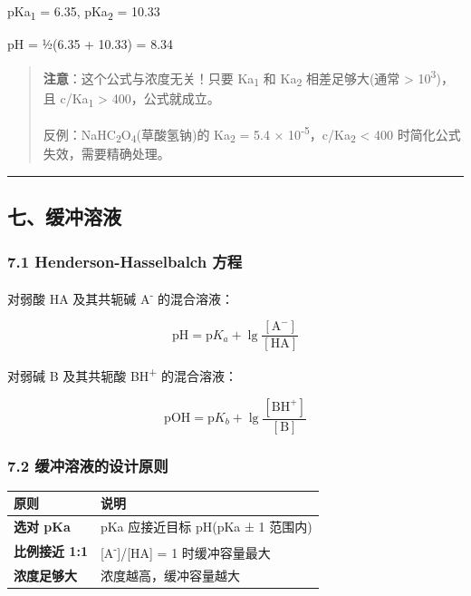 \documentclass[a4paper,11pt]{ctexart}
\newcounter{none}
\newcommand{\箭}{\ensuremath{\rightarrow}}
\newcommand{\左箭}{\ensuremath{\leftarrow}}
\newcommand{\上箭}{\ensuremath{\uparrow}}
\newcommand{\下箭}{\ensuremath{\downarrow}}
\newcommand{\衡}{\ensuremath{\rightleftharpoons}}
\newcommand{\双箭}{\ensuremath{\leftrightarrow}}
\newcommand{\约等于}{\ensuremath{\approx}}
\newcommand{\小于等于}{\ensuremath{\leq}}
\newcommand{\大于等于}{\ensuremath{\geq}}
\newcommand{\不等于}{\ensuremath{\neq}}
\newcommand{\西格马}{\ensuremath{\sigma}}
\newcommand{\派}{\ensuremath{\pi}}
\begin{document}
pKa\textsubscript{1} = 6.35, pKa\textsubscript{2} = 10.33

pH = ½(6.35 + 10.33) = 8.34

\begin{quote}
\textbf{注意}：这个公式与浓度无关！只要 Ka\textsubscript{1} 和 Ka\textsubscript{2} 相差足够大(通常 \textgreater{} 10\textsuperscript{3})，且 c/Ka\textsubscript{1} \textgreater{} 400，公式就成立。

反例：NaHC\textsubscript{2}O\textsubscript{4}(草酸氢钠)的 Ka\textsubscript{2} = 5.4 × 10\textsuperscript{-5}，c/Ka\textsubscript{2} \textless{} 400 时简化公式失效，需要精确处理。
\end{quote}

\begin{center}\rule{0.5\linewidth}{0.5pt}\end{center}

\subsection{七、缓冲溶液}\label{ux4e03ux7f13ux51b2ux6eb6ux6db2}

\subsubsection{7.1 Henderson-Hasselbalch 方程}\label{henderson-hasselbalch-ux65b9ux7a0b}

对弱酸 HA 及其共轭碱 A\textsuperscript{-} 的混合溶液：

\[
\boxed{\mathrm{pH} = \mathrm{p}K_a + \lg\frac{[\mathrm{A^-}]}{[\mathrm{HA}]}}
\]

对弱碱 B 及其共轭酸 BH\textsuperscript{+} 的混合溶液：

\[
\mathrm{pOH} = \mathrm{p}K_b + \lg\frac{[\mathrm{BH^+}]}{[\mathrm{B}]}
\]

\subsubsection{7.2 缓冲溶液的设计原则}\label{ux7f13ux51b2ux6eb6ux6db2ux7684ux8bbeux8ba1ux539fux5219}

{\def\LTcaptype{none} %
\begin{longtable}[]{@{}ll@{}}
\toprule\noalign{}
原则 & 说明 \\
\midrule\noalign{}
\endhead
\bottomrule\noalign{}
\endlastfoot
\textbf{选对 pKa} & pKa 应接近目标 pH(pKa ± 1 范围内) \\
\textbf{比例接近 1:1} & {[}A\textsuperscript{-}{]}/{[}HA{]} = 1 时缓冲容量最大 \\
\textbf{浓度足够大} & 浓度越高，缓冲容量越大 \\
\end{longtable}
}
\end{document}

